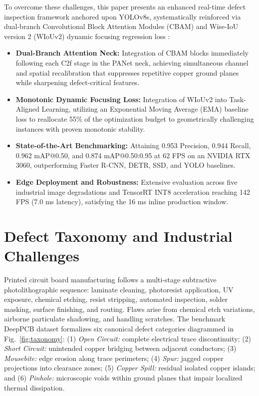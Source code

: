 \documentclass{llncs}
\begin{document}
To overcome these challenges, this paper presents an enhanced real-time defect inspection framework anchored upon YOLOv8s, systematically reinforced via dual-branch Convolutional Block Attention Modules (CBAM) \cite{woo2018cbam} and Wise-IoU version 2 (WIoUv2) dynamic focusing regression loss \cite{tong2023wiou}:
\begin{itemize}
    \item \textbf{Dual-Branch Attention Neck:} Integration of CBAM blocks immediately following each C2f stage in the PANet neck, achieving simultaneous channel and spatial recalibration that suppresses repetitive copper ground planes while sharpening defect-critical features.
    \item \textbf{Monotonic Dynamic Focusing Loss:} Integration of WIoUv2 into Task-Aligned Learning, utilizing an Exponential Moving Average (EMA) baseline loss to reallocate 55\% of the optimization budget to geometrically challenging instances with proven monotonic stability.
    \item \textbf{State-of-the-Art Benchmarking:} Attaining 0.953 Precision, 0.944 Recall, 0.962 mAP@0.50, and 0.874 mAP@0.50:0.95 at 62 FPS on an NVIDIA RTX 3060, outperforming Faster R-CNN, DETR, SSD, and YOLO baselines.
    \item \textbf{Edge Deployment and Robustness:} Extensive evaluation across five industrial image degradations and TensorRT INT8 acceleration reaching 142 FPS (7.0 ms latency), satisfying the 16 ms inline production window.
\end{itemize}

\section{Defect Taxonomy and Industrial Challenges}
Printed circuit board manufacturing follows a multi-stage subtractive photolithographic sequence: laminate cleaning, photoresist application, UV exposure, chemical etching, resist stripping, automated inspection, solder masking, surface finishing, and routing. Flaws arise from chemical etch variations, airborne particulate shadowing, and handling scratches. The benchmark DeepPCB dataset \cite{ding2021tinypcb} formalizes six canonical defect categories diagrammed in Fig.~\ref{fig:taxonomy}: (1) \textit{Open Circuit:} complete electrical trace discontinuity; (2) \textit{Short Circuit:} unintended copper bridging between adjacent conductors; (3) \textit{Mousebite:} edge erosion along trace perimeters; (4) \textit{Spur:} jagged copper projections into clearance zones; (5) \textit{Copper Spill:} residual isolated copper islands; and (6) \textit{Pinhole:} microscopic voids within ground planes that impair localized thermal dissipation.
\end{document}
